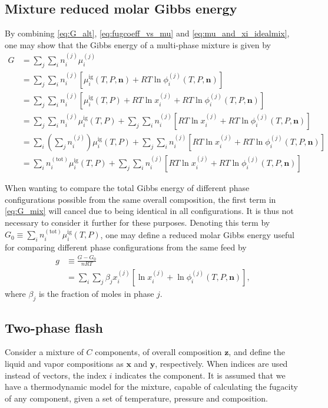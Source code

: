 \documentclass[internal,english]{sintefmemo2012}
\newcommand*{\vektor}[1]{\boldsymbol{#1}}%
\begin{document}
\subsection{Mixture reduced molar Gibbs energy}
By combining \eqref{eq:G_alt}, \eqref{eq:fugcoeff_vs_mu} and \eqref{eq:mu_and_xi_idealmix}, one may show that 
the Gibbs energy of a multi-phase mixture is given by 
\begin{align}
  G &= \sum_j \sum_i n_i^{(j)} \mu_i^{(j)} \nonumber\\
  &= \sum_j\sum_i n_i^{(j)} \left[ \mu_i^\text{ig}(T,P,\vektor{n}) + RT\ln \phi_i^{(j)}(T,P,\vektor{n})\right] \nonumber\\
  &= \sum_j\sum_i n_i^{(j)} \left[ \mu_i^\text{ig}(T,P) + RT\ln x_i^{(j)} + RT\ln \phi_i^{(j)}(T,P,\vektor{n})\right] \nonumber\\
  &= \sum_j\sum_i n_i^{(j)} \mu_i^\text{ig}(T,P) +  \sum_j \sum_i n_i^{(j)} \left[ RT\ln x_i^{(j)} + RT\ln \phi_i^{(j)}(T,P,\vektor{n})\right] \nonumber\\
  &= \sum_i \left( \sum_j n_i^{(j)} \right) \mu_i^\text{ig}(T,P) +  
      \sum_j \sum_i n_i^{(j)} \left[ RT\ln x_i^{(j)} + RT\ln \phi_i^{(j)}(T,P,\vektor{n})\right] \nonumber\\
  &= \sum_i  n_i^{(\text{tot})}  \mu_i^\text{ig}(T,P) +  
      \sum_j \sum_i n_i^{(j)} \left[ RT\ln x_i^{(j)} + RT\ln \phi_i^{(j)}(T,P,\vektor{n})\right] 
  \label{eq:G_mix}
\end{align}

When wanting to compare the total Gibbs energy of different phase configurations possible from the same overall composition, 
the first term in \eqref{eq:G_mix} will cancel due to being identical in all configurations. It is thus not necessary to consider 
it further for these purposes. Denoting this term by $G_0 \equiv \sum_i  n_i^{(\text{tot})}  \mu_i^\text{ig}(T,P)$, one may 
define a reduced molar Gibbs energy useful for comparing different phase configurations from the same feed by 
\begin{align}
  g &\equiv \frac{G - G_0 }{nRT} \nonumber\\
    &= \sum_i \sum_j \beta_j  x_i^{(j)} \left[ \ln x_i^{(j)} + \ln \phi_i^{(j)}(T,P,\vektor{n})\right],
  \label{eq:g_func}
\end{align}
where $\beta_j$ is the fraction of moles in phase $j$.


\subsection{Two-phase flash}
Consider a mixture of $C$ components, of overall composition $\vektor{z}$, and define the liquid and vapor compositions as 
$\vektor{x}$ and $\vektor{y}$, respectively. When indices are used instead of vectors, the index $i$ indicates the component.
It is assumed that we have a thermodynamic model for the mixture, capable of calculating the fugacity of any component, given a set of   
temperature, pressure and composition.
\end{document}
